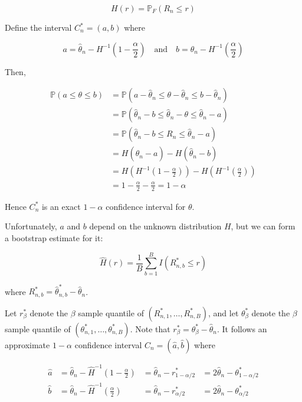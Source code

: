 \[ H(r) = \mathbb{P}_F(R_n \leq r)\]

Define the interval \(C_n^* = (a, b)\) where

\[
a = \hat{\theta}_n - H^{-1}\left( 1 - \frac{\alpha}{2} \right) 
\quad\text{and}\quad
b = \hat{\theta}_n - H^{-1}\left( \frac{\alpha}{2} \right) 
\]

Then,

\begin{align}
\mathbb{P}(a \leq \theta \leq b) &= \mathbb{P}(a - \hat{\theta}_n \leq \theta - \hat{\theta}_n \leq b - \hat{\theta}_n) \\
&= \mathbb{P}(\hat{\theta}_n - b \leq \hat{\theta}_n - \theta \leq \hat{\theta}_n - a) \\
&= \mathbb{P}(\hat{\theta}_n - b \leq R_n \leq \hat{\theta}_n - a) \\
&= H(\hat{\theta}_n - a) - H(\hat{\theta}_n - b) \\
&= H\left(H^{-1}\left( 1 - \frac{\alpha}{2} \right) \right) - H\left(H^{-1}\left( \frac{\alpha}{2} \right)\right) \\
&= 1 - \frac{\alpha}{2}  - \frac{\alpha}{2} = 1 - \alpha
\end{align}

Hence \(C_n^*\) is an exact \(1 - \alpha\) confidence interval for
\(\theta\).

Unfortunately, \(a\) and \(b\) depend on the unknown distribution \(H\),
but we can form a bootstrap estimate for it:

\[\hat{H}(r) = \frac{1}{B} \sum_{b=1}^B I(R_{n, b}^* \leq r)\]

where \(R_{n, b}^* = \hat{\theta}_{n, b}^* - \hat{\theta}_n\).

Let \(r_\beta^*\) denote the \(\beta\) sample quantile of
\((R_{n, 1}^*, \dots, R_{n, B}^*)\), and let \(\theta_\beta^*\) denote
the \(\beta\) sample quantile of
\((\theta_{n, 1}^*, \dots, \theta_{n, B}^*)\). Note that
\(r_\beta^* = \theta_\beta^* - \hat{\theta}_n\). It follows an
approximate \(1 - \alpha\) confidence interval
\(C_n = (\hat{a}, \hat{b})\) where

\begin{align}
\hat{a} 
&= \hat{\theta}_n - \hat{H}^{-1}\left(1 - \frac{\alpha}{2}\right) 
&= \hat{\theta}_n - r_{1 - \alpha/2}^* 
&= 2\hat{\theta}_n - \theta_{1 - \alpha/2}^* \\
\hat{b} 
&= \hat{\theta}_n - \hat{H}^{-1}\left(\frac{\alpha}{2}\right) 
&= \hat{\theta}_n - r_{\alpha/2}^* 
&= 2\hat{\theta}_n - \theta_{\alpha/2}^* 
\end{align}

